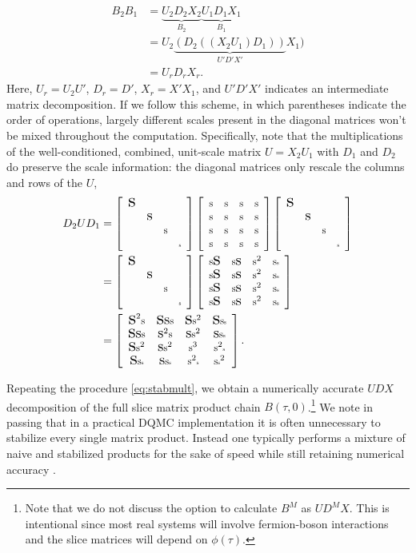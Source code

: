 \documentclass[submission, Phys]{SciPost}
\newcommand{\stiny}{\scalebox{0.5}{s}}
\newcommand{\ssmall}{\scalebox{0.9}{s}}
\newcommand{\smedium}{\scalebox{1.3}{s}}
\newcommand{\slarge}{\scalebox{1.7}{s}}
\newcommand{\U}{\left[
	\begin{array}{cccc}
		\ssmall & \ssmall & \ssmall & \ssmall \\
		\ssmall & \ssmall & \ssmall & \ssmall \\
		\ssmall & \ssmall & \ssmall & \ssmall \\
		\ssmall & \ssmall & \ssmall & \ssmall \\
	\end{array}
	\right]}
\newcommand{\D}{\left[
	\begin{array}{cccc}
		\slarge &  &  &  \\
		& \smedium &  &  \\
		&  & \ssmall &  \\
		&  &  & \stiny \\
	\end{array}
	\right]}
\begin{document}
\begin{align}
	B_2 B_1 &= \underbrace{U_2 D_2 X_2}_{B_2}\underbrace{U_1 D_1 X_1}_{B_1} \nonumber\\
	&= U_2 \underbrace{(D_2 ((X_2 U_1) D_1))}_{U' D' X'} X_1)\label{eq:stabmult}\\
	&= U_r D_r X_r. \nonumber
\end{align}
Here, $U_r = U_2 U'$, $D_r = D'$, $X_r = X' X_1$, and $U'D'X'$ indicates an intermediate matrix decomposition. If we follow this scheme, in which parentheses indicate the order of operations, largely different scales present in the diagonal matrices won't be mixed throughout the computation. Specifically, note that the multiplications of the well-conditioned, combined, unit-scale matrix $U = X_2 U_1$ with $D_1$ and $D_2$ do preserve the scale information: the diagonal matrices only rescale the columns and rows of the $U$,
\begin{align}
D_2  U D_1 &= \D  \U \D  \\
&= \D \left[
\begin{array}{cccc}
\ssmall\slarge & \ssmall\smedium & \ssmall^2 & \ssmall\stiny \\
\ssmall\slarge & \ssmall\smedium & \ssmall^2 & \ssmall\stiny \\
\ssmall\slarge & \ssmall\smedium & \ssmall^2 & \ssmall\stiny \\
\ssmall\slarge & \ssmall\smedium & \ssmall^2 & \ssmall\stiny \\
\end{array}
\right]\\
&= \left[
\begin{array}{cccc}
	\slarge^2\ssmall & \slarge\smedium\ssmall & \slarge\ssmall^2 & \slarge\ssmall\stiny \\
	\slarge\smedium\ssmall & \smedium^2\ssmall & \smedium\ssmall^2 & \smedium\ssmall\stiny \\
	\slarge\ssmall^2 & \smedium\ssmall^2 & \ssmall^3 & \ssmall^2\stiny \\
	\slarge\ssmall\stiny & \smedium\ssmall\stiny & \ssmall^2\stiny & \ssmall\stiny^2 \\
\end{array}
\right].
\end{align}

Repeating the procedure \eqref{eq:stabmult}, we obtain a numerically accurate $UDX$ decomposition of the full slice matrix product chain $B(\tau, 0)$.\footnote{Note that we do not discuss the option to calculate $B^M$ as $U D^M X$. This is intentional since most real systems will involve fermion-boson interactions and the slice matrices will depend on $\phi(\tau)$.} We note in passing that in a practical DQMC implementation it is often unnecessary to stabilize every single matrix product. Instead one typically performs a mixture of naive and stabilized products for the sake of speed while still retaining numerical accuracy \cite{Assaad2002a}.
\end{document}
